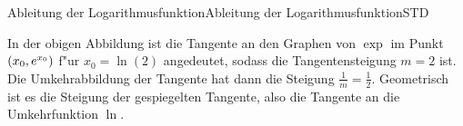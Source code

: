 \begin{MXContent}{Ableitung der Logarithmusfunktion}{Ableitung der Logarithmusfunktion}{STD}
\begin{center}
\begin{small}
\end{small}
\end{center}
\fi
In der obigen Abbildung ist die Tangente an den Graphen von $\exp$ im
Punkt $(x_0, e^{x_0})$ f"ur $x_0 = \ln(2)$ angedeutet, sodass die 
Tangentensteigung $m = 2$ ist. Die Umkehrabbildung der Tangente hat dann 
die Steigung $\frac{1}{m} = \frac{1}{2}$. 
Geometrisch ist es die Steigung der gespiegelten Tangente, also die Tangente
an die Umkehrfunktion $\ln$.

\end{MXContent}



